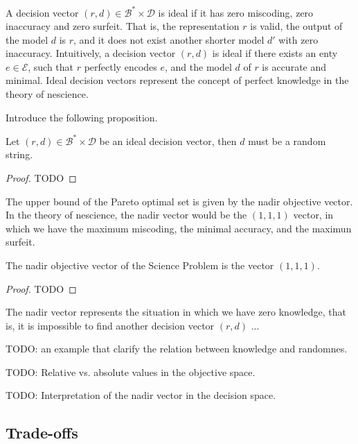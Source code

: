 A decision vector $(r, d) \in \mathcal{B}^\ast \times \mathcal{D}$ is ideal if it has zero miscoding, zero inaccuracy and zero surfeit. That is, the representation $r$ is {\color{red}valid}, the output of the model $d$ is $r$, and it does not exist another shorter model $d'$ with zero inaccuracy. Intuitively, a decision vector $(r, d)$ is ideal if there exists an enty $e \in \mathcal{E}$, such that $r$ perfectly encodes $e$, and the model $d$ of $r$ is accurate and minimal. Ideal decision vectors represent the concept of perfect knowledge in the theory of nescience.

{\color{red} Introduce the following proposition.}

\begin{proposition}
Let $(r, d) \in \mathcal{B}^\ast \times \mathcal{D}$ be an ideal decision vector, then $d$ must be a random string.
\end{proposition}
\begin{proof}
{\color{red} TODO}
\end{proof}


The upper bound of the Pareto optimal set is given by the nadir objective vector. In the theory of nescience, the nadir vector would be the $(1, 1, 1)$ vector, in which we have the maximum miscoding, the minimal accuracy, and the maximun surfeit.

\begin{proposition}
The nadir objective vector of the Science Problem is the vector $(1, 1, 1)$.
\end{proposition}
\begin{proof}
{\color{red} TODO}
\end{proof}

The nadir vector represents the situation in which we have zero knowledge, that is, {\color{red} it is impossible to find another decision vector $(r, d)$ ... }

\begin{example}
{\color{red} TODO: an example that clarify the relation between knowledge and randomnes.}
\end{example}

{\color{red} TODO: Relative vs. absolute values in the objective space.}

{\color{red} TODO: Interpretation of the nadir vector in the decision space.}


\subsection{Trade-offs}

